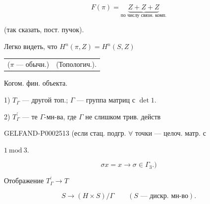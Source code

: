 \begin{center}\end{center}





\begin{equation*}F(\pi)=\underbrace{Z+Z+Z}_{\text{по числу связн. комп.}}\end{equation*}

(так сказать, пост. пучок).





Легко видеть, что $H^n(\pi,Z)=H^n(S,Z)$

\begin{center}\begin{tabular}{@{}c@{\qquad\qquad}c@{}}($\pi$ — обычн.)&(Топологич.).\end{tabular}\end{center}

Когом. фин. объекта.





1) $T_\Gamma$ — другой топ.; $\Gamma$ — группа матриц с $\det 1$.

2) $T^\prime_\Gamma$ — те $\Gamma$-мн-ва, где $\Gamma$ не слишком трив. действ





\begin{GelfandAdjacentEvidence}{GELFAND-P000251}{3}
(если стац. подгр. $\forall$ точки — целоч. матр. с




$1\ \mathrm{mod}\ 3$.

\begin{equation*}\sigma x=x\to\sigma\in\Gamma_3.)\end{equation*}
\end{GelfandAdjacentEvidence}





Отображение $T^\prime_\Gamma\to T$

\begin{equation*}S\to(H\times S)/\Gamma\qquad (S\text{ — дискр. мн-во}).\end{equation*}





